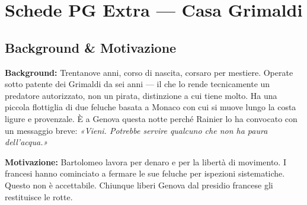 
\chapter{Schede PG Extra --- Casa Grimaldi}



\section*{Background \& Motivazione}

\begin{rulebox}{}
  \textbf{Background:} Trentanove anni, corso di nascita, corsaro per mestiere.
  Operate sotto patente dei Grimaldi da sei anni — il che lo rende tecnicamente
  un predatore autorizzato, non un pirata, distinzione a cui tiene molto.
  Ha una piccola flottiglia di due feluche basata a Monaco con cui si muove
  lungo la costa ligure e provenzale. È a Genova questa notte perché Rainier
  lo ha convocato con un messaggio breve: \textit{«Vieni. Potrebbe servire
  qualcuno che non ha paura dell'acqua.»}

  \medskip\noindent\textcolor{GrimaldiPurple}{\textbf{Motivazione:}} Bartolomeo
  lavora per denaro e per la libertà di movimento. I francesi hanno cominciato
  a fermare le sue feluche per ispezioni sistematiche. Questo non è accettabile.
  Chiunque liberi Genova dal presidio francese gli restituisce le rotte.
\end{rulebox}

